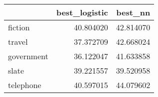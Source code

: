 \begin{tabular}{lrr}
\toprule
{} &  best\_logistic &    best\_nn \\
\midrule
fiction    &      40.804020 &  42.814070 \\
travel     &      37.372709 &  42.668024 \\
government &      36.122047 &  41.633858 \\
slate      &      39.221557 &  39.520958 \\
telephone  &      40.597015 &  44.079602 \\
\bottomrule
\end{tabular}
